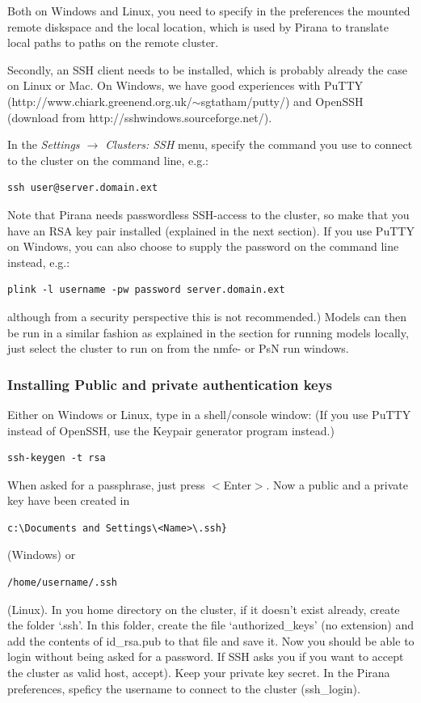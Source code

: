 {{{{\noindent Both on Windows and Linux, you need to specify in the
preferences the mounted remote diskspace and the local location, which
is used by Pirana to translate local paths to paths on the remote
cluster.

\noindent Secondly, an SSH client  needs to be installed, which is probably
already the case on Linux or Mac. On Windows, we have good experiences
with PuTTY
(http://www.chiark.greenend.org.uk/$\sim$sgtatham/putty/) and OpenSSH (download from
http://sshwindows.sourceforge.net/).

In the \textit{Settings $\rightarrow$ Clusters: SSH} menu, specify the
command you use to connect to the cluster on the command line, e.g.:

\begin{lstlisting}
ssh user@server.domain.ext
\end{lstlisting}

\noindent Note that Pirana needs passwordless SSH-access to the cluster, so make
that you have an RSA key pair installed (explained in the next
section). If you use PuTTY on Windows, you can also choose to supply
the password on the command line instead, e.g.:

\begin{lstlisting}
plink -l username -pw password server.domain.ext
\end{lstlisting}

\noindent although from a security perspective this is not recommended.)
Models can then be run in a similar fashion as explained in
the section for running models locally, just select the cluster to run
on from the nmfe- or PsN run windows.

\subsubsection*{Installing Public and private authentication keys}

Either on Windows or Linux, type in a shell/console window: (If you use PuTTY instead of OpenSSH, use the Keypair generator program instead.)\\
\begin{lstlisting}
ssh-keygen -t rsa
\end{lstlisting}

\noindent When asked for a passphrase, just press $<$Enter$>$.  Now a
public and a private key have been created in
\begin{verbatim}c:\Documents and Settings\<Name>\.ssh}\end{verbatim} (Windows) or
\begin{verbatim}/home/username/.ssh\end{verbatim}(Linux). In you home
directory on the cluster, if it doesn't exist already, create the
folder `.ssh'. In this folder, create the file `authorized\_keys' (no
extension) and add the contents of id\_rsa.pub to that file and save
it. Now you should be able to login without being asked for a password.
If SSH asks you if you want to accept the cluster as valid host, accept). Keep your private key
secret. In the Pirana preferences, speficy the username to connect to
the cluster (ssh\_login).

}}}}
